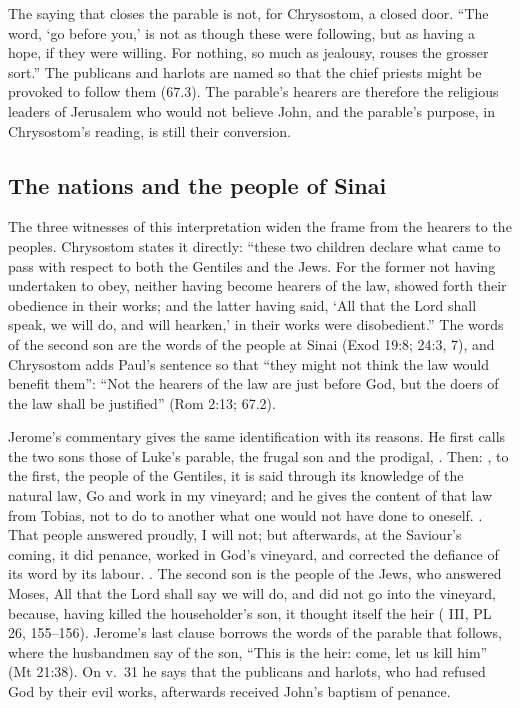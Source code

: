 The saying that closes the parable is not, for Chrysostom, a closed door. ``The
word, `go before you,' is not as though these were following, but as having a
hope, if they were willing. For nothing, so much as jealousy, rouses the
grosser sort.'' The publicans and harlots are named so that the chief priests
might be provoked to follow them (67.3). The parable's hearers are therefore
the religious leaders of Jerusalem who would not believe John, and the
parable's purpose, in Chrysostom's reading, is still their conversion.

\subsection{The nations and the people of Sinai}

The three witnesses of this interpretation widen the frame from the hearers to
the peoples. Chrysostom states it directly: ``these two children declare what
came to pass with respect to both the Gentiles and the Jews. For the former not
having undertaken to obey, neither having become hearers of the law, showed
forth their obedience in their works; and the latter having said, `All that
the Lord shall speak, we will do, and will hearken,' in their works were
disobedient.'' The words of the second son are the words of the people at
Sinai (Exod 19:8; 24:3, 7), and Chrysostom adds Paul's sentence so that ``they
might not think the law would benefit them'': ``Not the hearers of the law are
just before God, but the doers of the law shall be justified'' (Rom 2:13;
 67.2).

Jerome's commentary gives the same identification with its reasons. He first
calls the two sons those of Luke's parable, the frugal son and the prodigal,
. Then: , to the first, the
people of the Gentiles, it is said through its knowledge of the natural law,
Go and work in my vineyard; and he gives the content of that law from Tobias,
not to do to another what one would not have done to oneself. . That
people answered proudly, I will not; but afterwards, at the Saviour's coming,
it did penance, worked in God's vineyard, and corrected the defiance of its
word by its labour. . The
second son is the people of the Jews, who answered Moses, All that the Lord
shall say we will do, and did not go into the vineyard, because, having killed
the householder's son, it thought itself the heir ( III, PL 26, 155--156). Jerome's last clause borrows the words of the
parable that follows, where the husbandmen say of the son, ``This is the heir:
come, let us kill him'' (Mt 21:38). On v.~31 he says that the publicans and
harlots, who had refused God by their evil works, afterwards received John's
baptism of penance.

